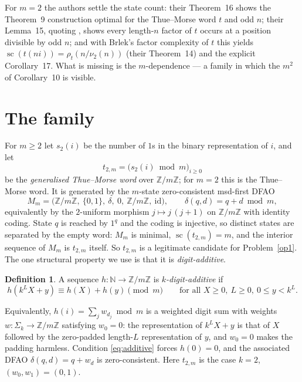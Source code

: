 \documentclass[10pt,reqno]{amsart}
\theoremstyle{plain}
\theoremstyle{definition}
\newtheorem{definition}[theorem]{Definition}
\theoremstyle{remark}
\numberwithin{theorem}{section}
\DeclareMathOperator{\sco}{sc}
\newcommand{\Zm}{\mathbb{Z}/m\mathbb{Z}}
\newcommand{\N}{\mathbb{N}}
\newcommand{\Sig}{\Sigma_k}
\newcommand{\tm}{t_{2,m}}
\begin{document}
For $m = 2$ the authors settle the state count: their Theorem~16 shows the Theorem~9
construction optimal for the Thue--Morse word $t$ and odd $n$; their Lemma~15, quoting
\cite{BSCRF}, shows every length-$n$ factor of $t$ occurs at a position divisible by odd
$n$; and with Brlek's factor complexity of $t$ \cite{Brlek} this yields
$\sco(t(ni)) = \rho_t(n/\nu_2(n))$ (their Theorem~14) and the explicit Corollary~17. What is
missing is the $m$-dependence --- a family in which the $m^2$ of Corollary~10 is visible.

\section{The family}
\label{sec:family}

For $m \ge 2$ let $s_2(i)$ be the number of $1$s in the binary representation of $i$, and
let
\[
  \tm = \bigl(s_2(i) \bmod m\bigr)_{i \ge 0}
\]
be the \emph{generalised Thue--Morse word} over $\Zm$; for $m = 2$ this is the Thue--Morse
word. It is generated by the $m$-state zero-consistent msd-first DFAO
\[
  M_m = \bigl(\Zm,\ \{0,1\},\ \delta,\ 0,\ \Zm,\ \mathrm{id}\bigr),
  \qquad \delta(q,d) = q + d \bmod m ,
\]
equivalently by the $2$-uniform morphism $j \mapsto j\,(j{+}1)$ on $\Zm$ with identity
coding. State $q$ is reached by $1^q$ and the coding is injective, so distinct states are
separated by the empty word: $M_m$ is minimal, $\sco(\tm) = m$, and the interior sequence of
$M_m$ is $\tm$ itself. So $\tm$ is a legitimate candidate for Problem~\ref{op1}. The one
structural property we use is that it is \emph{digit-additive}.

\begin{definition}
A sequence $h : \N \to \Zm$ is \emph{$k$-digit-additive} if
\begin{equation}
  h(k^L X + y) \equiv h(X) + h(y) \pmod m
  \qquad\text{for all } X \ge 0,\ L \ge 0,\ 0 \le y < k^L .
  \label{eq:additive}
\end{equation}
\end{definition}

Equivalently, $h(i) = \sum_j w_{d_j} \bmod m$ is a weighted digit sum with weights
$w : \Sig \to \Zm$ satisfying $w_0 = 0$: the representation of $k^L X + y$ is that of $X$
followed by the zero-padded length-$L$ representation of $y$, and $w_0 = 0$ makes the
padding harmless. Condition \eqref{eq:additive} forces $h(0) = 0$, and the associated DFAO
$\delta(q,d) = q + w_d$ is zero-consistent. Here $\tm$ is the case $k = 2$,
$(w_0,w_1) = (0,1)$.
\end{document}

